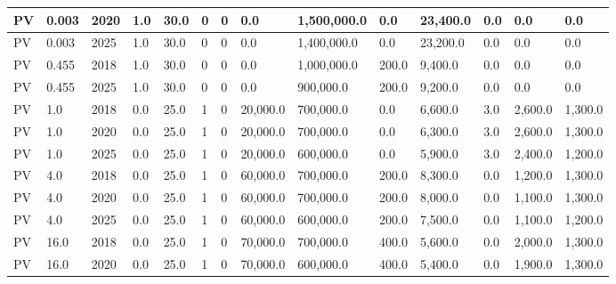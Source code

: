 \begin{table*}[]
\begin{tabularx}{\linewidth}{|p{}|l|x|l|l|l|l|l|l|l|l|l|l|l|}
PV                            & 0.003       & 2020             & 1.0    & 30.0 & 0     & 0     & 0.0       & 1,500,000.0 & 0.0       & 23,400.0 & 0.0   & 0.0      & 0.0       \\ \hline
PV                            & 0.003       & 2025             & 1.0    & 30.0 & 0     & 0     & 0.0       & 1,400,000.0 & 0.0       & 23,200.0 & 0.0   & 0.0      & 0.0       \\ \hline
PV                            & 0.455       & 2018             & 1.0    & 30.0 & 0     & 0     & 0.0       & 1,000,000.0 & 200.0     & 9,400.0  & 0.0   & 0.0      & 0.0       \\ \hline
PV                            & 0.455       & 2025             & 1.0    & 30.0 & 0     & 0     & 0.0       & 900,000.0   & 200.0     & 9,200.0  & 0.0   & 0.0      & 0.0       \\ \hline
PV                            & 1.0         & 2018             & 0.0    & 25.0 & 1     & 0     & 20,000.0  & 700,000.0   & 0.0       & 6,600.0  & 3.0   & 2,600.0  & 1,300.0   \\ \hline
PV                            & 1.0         & 2020             & 0.0    & 25.0 & 1     & 0     & 20,000.0  & 700,000.0   & 0.0       & 6,300.0  & 3.0   & 2,600.0  & 1,300.0   \\ \hline
PV                            & 1.0         & 2025             & 0.0    & 25.0 & 1     & 0     & 20,000.0  & 600,000.0   & 0.0       & 5,900.0  & 3.0   & 2,400.0  & 1,200.0   \\ \hline
PV                            & 4.0         & 2018             & 0.0    & 25.0 & 1     & 0     & 60,000.0  & 700,000.0   & 200.0     & 8,300.0  & 0.0   & 1,200.0  & 1,300.0   \\ \hline
PV                            & 4.0         & 2020             & 0.0    & 25.0 & 1     & 0     & 60,000.0  & 700,000.0   & 200.0     & 8,000.0  & 0.0   & 1,100.0  & 1,300.0   \\ \hline
PV                            & 4.0         & 2025             & 0.0    & 25.0 & 1     & 0     & 60,000.0  & 600,000.0   & 200.0     & 7,500.0  & 0.0   & 1,100.0  & 1,200.0   \\ \hline
PV                            & 16.0        & 2018             & 0.0    & 25.0 & 1     & 0     & 70,000.0  & 700,000.0   & 400.0     & 5,600.0  & 0.0   & 2,000.0  & 1,300.0   \\ \hline
PV                            & 16.0        & 2020             & 0.0    & 25.0 & 1     & 0     & 70,000.0  & 600,000.0   & 400.0     & 5,400.0  & 0.0   & 1,900.0  & 1,300.0   \\ \hline

\end{tabularx}
\end{table*}
